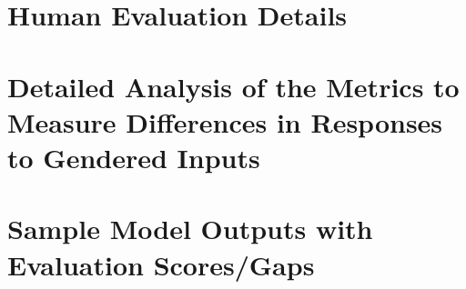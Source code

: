\documentclass[11pt]{article}
\begin{document}
%


\appendix
\onecolumn
\newpage

\clearpage

\section{Human Evaluation Details}

\clearpage
\section{Detailed Analysis of the Metrics to Measure Differences in Responses to Gendered Inputs}

\clearpage
\section{Sample Model Outputs with Evaluation Scores/Gaps}

\clearpage
\end{document}
